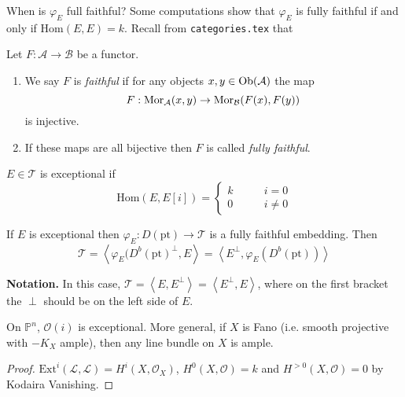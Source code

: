 When is $\varphi_E$ full faithful? Some computations show that $\varphi_E$ is
fully faithful if and only if $\text{Hom}(E,E)=k$. Recall from 
\texttt{categories.tex} that

\begin{definition}
\label{definition-faithful}
Let $F : \mathcal{A} \to \mathcal{B}$ be a functor.
\begin{enumerate}
\item We say $F$ is {\it faithful} if
for any objects $x, y \in \mathop{\mathrm{Ob}}\nolimits(\mathcal{A})$ the map
$$
F : \mathop{\mathrm{Mor}}\nolimits_\mathcal{A}(x, y) \to \mathop{\mathrm{Mor}}\nolimits_\mathcal{B}(F(x), F(y))
$$
is injective.
\item If these maps are all bijective then $F$ is called
{\it fully faithful}.
\end{enumerate}
\end{definition}

\medskip\noindent
\begin{definition}
\label{definition-exceptional-object}
$E \in \mathcal{T}$ is exceptional if 
$$
\text{Hom}(E,E[i])=
\begin{cases}
k\qquad &i=0 \\
0\qquad &i \neq 0
\end{cases}
$$
\end{definition}

\begin{lemma}
\label{lemma-exeptional-implies-fully-faithful}
If $E$ is exceptional then $\varphi_E:D(\text{pt}) \to \mathcal{T}$ is a fully
faithful embedding. Then
$$
\mathcal{T}=\left<\varphi_E(D^b(\text{pt})^\perp,E\right>=
\left<E^\perp,\varphi_E(D^b(\text{pt}))\right>
$$
\end{lemma}

{\bf Notation.} In this case,
$\mathcal{T}=\left<E,E^\perp\right>=\left<E^\perp,E\right>$, where on the first
bracket the $\perp$ should be on the left side of $E$.

\begin{example}
\label{example-all-line-bundles-are-exceptional-on-Fano}
On  $\mathbb{P}^n$, $\mathcal{O}(i)$ is exceptional. More general, if $X$ is
Fano (i.e. smooth projective with $-K_X$ ample), then any line bundle on  $X$ is
ample.
\end{example}

\begin{proof}
$\text{Ext}^i(\mathcal{L},\mathcal{L})=H^{i}(X,\mathcal{O}_X)$,
$H^{0}(X,\mathcal{O})=k$ and $H^{>0}(X,\mathcal{O})=0$ by Kodaira
Vanishing.
\end{proof}

